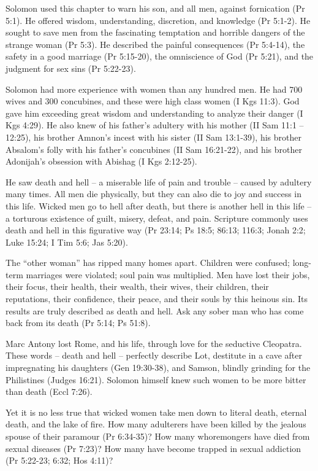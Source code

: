 Solomon used this chapter to warn his son, and all men, against fornication (Pr 5:1). He offered wisdom, understanding, discretion, and knowledge (Pr 5:1-2). He sought to save men from the fascinating temptation and horrible dangers of the strange woman (Pr 5:3). He described the painful consequences (Pr 5:4-14), the safety in a good marriage (Pr 5:15-20), the omniscience of God (Pr 5:21), and the judgment for sex sins (Pr 5:22-23).

Solomon had more experience with women than any hundred men. He had 700 wives and 300 concubines, and these were high class women (I Kgs 11:3). God gave him exceeding great wisdom and understanding to analyze their danger (I Kgs 4:29). He also knew of his father’s adultery with his mother (II Sam 11:1 – 12:25), his brother Amnon’s incest with his sister (II Sam 13:1-39), his brother Absalom’s folly with his father’s concubines (II Sam 16:21-22), and his brother Adonijah’s obsession with Abishag (I Kgs 2:12-25).

He saw death and hell – a miserable life of pain and trouble – caused by adultery many times. All men die physically, but they can also die to joy and success in this life. Wicked men go to hell after death, but there is another hell in this life – a torturous existence of guilt, misery, defeat, and pain. Scripture commonly uses death and hell in this figurative way (Pr 23:14; Ps 18:5; 86:13; 116:3; Jonah 2:2; Luke 15:24; I Tim 5:6; Jas 5:20).

The “other woman” has ripped many homes apart. Children were confused; long-term marriages were violated; soul pain was multiplied. Men have lost their jobs, their focus, their health, their wealth, their wives, their children, their reputations, their confidence, their peace, and their souls by this heinous sin. Its results are truly described as death and hell. Ask any sober man who has come back from its death (Pr 5:14; Ps 51:8). 

Marc Antony lost Rome, and his life, through love for the seductive Cleopatra. These words – death and hell – perfectly describe Lot, destitute in a cave after impregnating his daughters (Gen 19:30-38), and Samson, blindly grinding for the Philistines (Judges 16:21). Solomon himself knew such women to be more bitter than death (Eccl 7:26).

Yet it is no less true that wicked women take men down to literal death, eternal death, and the lake of fire. How many adulterers have been killed by the jealous spouse of their paramour (Pr 6:34-35)? How many whoremongers have died from sexual diseases (Pr 7:23)? How many have become trapped in sexual addiction (Pr 5:22-23; 6:32; Hos 4:11)?

